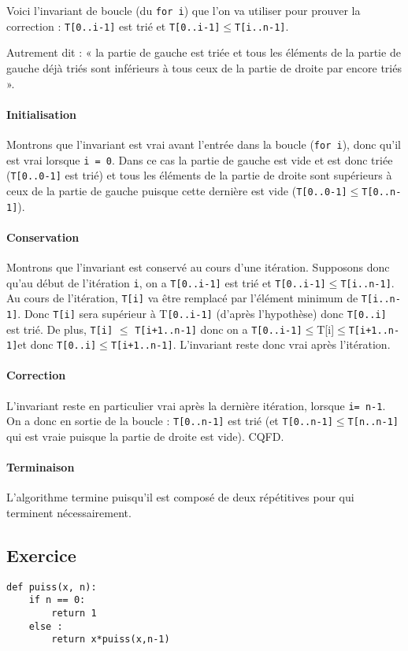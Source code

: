 \begin{corrige}

Voici l’invariant de boucle (du \lstinline{for i}) que l’on va utiliser pour prouver la correction :
\lstinline{T[0..i-1]} est trié et \lstinline{T[0..i-1]}$\leq$\lstinline{T[i..n-1]}.

Autrement dit : « la partie de gauche est triée et tous les éléments de la partie de
gauche déjà triés sont inférieurs à tous ceux de la partie de droite par encore triés ».

\paragraph*{Initialisation}
 Montrons que l’invariant est vrai avant l’entrée dans la boucle (\lstinline{for i}), donc qu’il est vrai lorsque \lstinline{i = 0}. Dans ce cas la partie de gauche est vide et est donc
triée (\lstinline{T[0..0-1]} est trié) et tous les éléments de la partie de droite sont supérieurs à ceux
de la partie de gauche puisque cette dernière est vide (\lstinline{T[0..0-1]}$\leq$\lstinline{T[0..n-1]}).

\paragraph*{Conservation}
 Montrons que l’invariant est conservé au cours d’une itération.
Supposons donc qu’au début de l’itération \lstinline{i}, on a \lstinline{T[0..i-1]} est trié et \lstinline{T[0..i-1]}$\leq$\lstinline{T[i..n-1]}.
Au cours de l’itération, \lstinline{T[i]} va être remplacé par l’élément minimum de \lstinline{T[i..n-1]}. Donc
\lstinline{T[i]} sera supérieur à T\lstinline{[0..i-1]} (d’après l’hypothèse) donc \lstinline{T[0..i]} est trié. De plus, \lstinline{T[i]} $\leq$
\lstinline{T[i+1..n-1]} donc on a \lstinline{T[0..i-1]}$\leq$T[i]$\leq$\lstinline{T[i+1..n-1]}et donc \lstinline{T[0..i]}$\leq$\lstinline{T[i+1..n-1]}.
L’invariant reste donc vrai après l’itération.

\paragraph*{Correction}
L’invariant reste en particulier vrai après la dernière itération, lorsque \lstinline{i= n-1}. On a donc en sortie de la boucle : \lstinline{T[0..n-1]} est trié (et \lstinline{T[0..n-1]}$\leq$\lstinline{T[n..n-1]} qui
est vraie puisque la partie de droite est vide). CQFD.

\paragraph*{Terminaison}
L’algorithme termine puisqu’il est composé de deux répétitives pour qui terminent
nécessairement.
\end{corrige}

\else
\fi


\subsection*{Exercice}


\begin{lstlisting}
def puiss(x, n):
    if n == 0:
        return 1
    else :
        return x*puiss(x,n-1)
\end{lstlisting}


